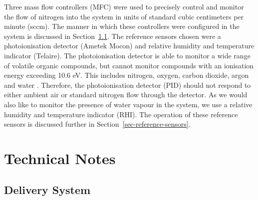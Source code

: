\documentclass[
  a4paper,
]{scrbook}
\begin{document}
Three mass flow controllers (MFC) were used to precisely control and
monitor the flow of nitrogen into the system in units of standard cubic
centimeters per minute (sccm). The manner in which these controllers
were configured in the system is discussed in
Section~\ref{sec-delivery-system}. The reference sensors chosen were a
photoionisation detector (Ametek Mocon) and relative humidity and
temperature indicator (Telaire). The photoionisation detector is able to
monitor a wide range of volatile organic compounds, but cannot monitor
compounds with an ionisation energy exceeding 10.6 eV. This includes
nitrogen, oxygen, carbon dioxide, argon and water
\autocite{PIDmanual,Ionscience}. Therefore, the photoionisation detector
(PID) should not respond to either ambient air or standard nitrogen flow
through the detector. As we would also like to monitor the presence of
water vapour in the system, we use a relative humidity and temperature
indicator (RHI). The operation of these reference sensors is discussed
further in Section~\ref{sec-reference-sensors}.

\hypertarget{technical-notes}{%
\section{Technical Notes}\label{technical-notes}}

\hypertarget{sec-delivery-system}{%
\subsection{Delivery System}\label{sec-delivery-system}}
\end{document}
